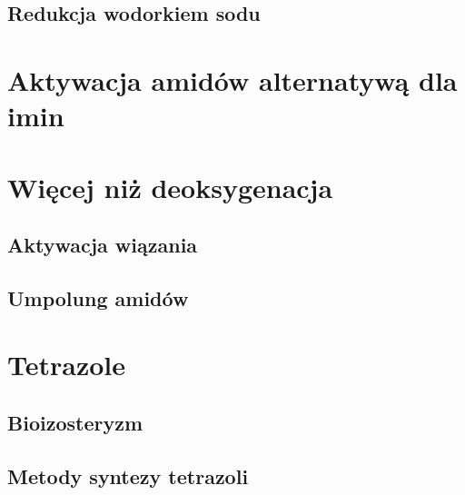 \subsection{Redukcja wodorkiem sodu}

\section{Aktywacja amidów alternatywą dla imin}

\section{Więcej niż deoksygenacja}
\subsection{Aktywacja wiązania }
\subsection{Umpolung amidów}

\section{Tetrazole}
\subsection{Bioizosteryzm}
\subsection{Metody syntezy tetrazoli}
